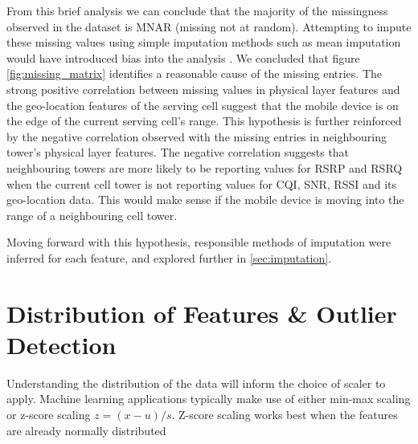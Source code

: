 From this brief analysis we can conclude that the majority of the missingness observed in the dataset is MNAR (missing not at random). Attempting to impute these missing values using simple imputation methods such as mean imputation would have introduced bias into the analysis \cite{DONDERS20061087}. We concluded that figure \ref{fig:missing_matrix} identifies a reasonable cause of the missing entries. The strong positive correlation between missing values in physical layer features and the geo-location features of the serving cell suggest that the mobile device is on the edge of the current serving cell's range. This hypothesis is further reinforced by the negative correlation observed with the missing entries in neighbouring tower's physical layer features. The negative correlation suggests that neighbouring towers are more likely to be reporting values for RSRP and RSRQ when the current cell tower is not reporting values for CQI, SNR, RSSI and its geo-location data. This would make sense if the mobile device is moving into the range of a neighbouring cell tower.

Moving forward with this hypothesis, responsible methods of imputation were inferred for each feature, and explored further in \ref{sec:imputation}.

\section{Distribution of Features \& Outlier Detection}
Understanding the distribution of the data will inform the choice of scaler to apply. Machine learning applications typically make use of either min-max scaling or z-score scaling $z = (x - u) / s$. Z-score scaling works best when the features are already normally distributed